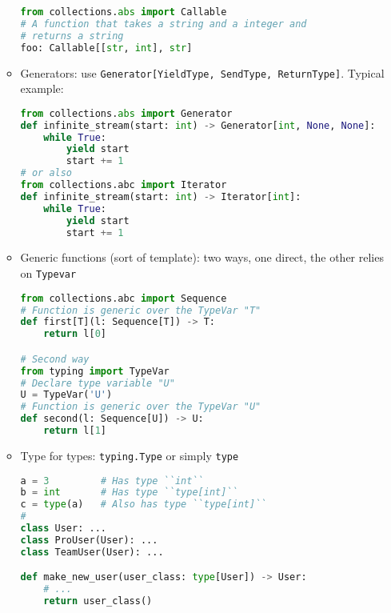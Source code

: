 \documentclass[a4paper,12pt,%
              final%
              ]{article}
\begin{document}
\begin{itemize}
\begin{itemize}
\begin{lstlisting}[language=python]
from collections.abs import Callable
# A function that takes a string and a integer and
# returns a string
foo: Callable[[str, int], str]
\end{lstlisting}
      \item Generators: use \verb|Generator[YieldType, SendType, ReturnType]|. Typical example:
\begin{lstlisting}[language=python]
from collections.abs import Generator
def infinite_stream(start: int) -> Generator[int, None, None]:
    while True:
        yield start
        start += 1
# or also
from collections.abc import Iterator
def infinite_stream(start: int) -> Iterator[int]:
    while True:
        yield start
        start += 1
\end{lstlisting}
      \item Generic functions (sort of template): two ways, one direct, the other relies on \texttt{Typevar}
\begin{lstlisting}[language=python]
from collections.abc import Sequence
# Function is generic over the TypeVar "T"
def first[T](l: Sequence[T]) -> T:
    return l[0]

# Second way
from typing import TypeVar
# Declare type variable "U"
U = TypeVar('U')
# Function is generic over the TypeVar "U"
def second(l: Sequence[U]) -> U:
    return l[1]
\end{lstlisting}
      \item Type for types: \verb|typing.Type| or simply \verb|type|
\begin{lstlisting}[language=python]
a = 3         # Has type ``int``
b = int       # Has type ``type[int]``
c = type(a)   # Also has type ``type[int]``
#
class User: ...
class ProUser(User): ...
class TeamUser(User): ...

def make_new_user(user_class: type[User]) -> User:
    # ...
    return user_class()


\end{lstlisting}
\end{itemize}
\end{itemize}
\end{document}
